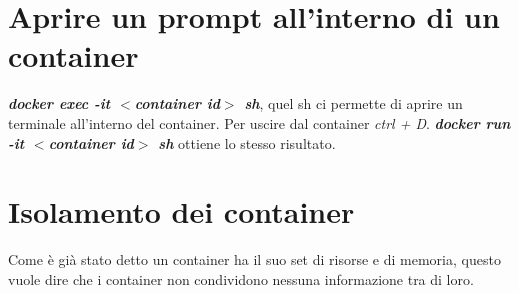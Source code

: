 \documentclass[11pt,a4paper]{book}
\begin{document}
\section{Aprire un prompt all'interno di un container}
\emph{\textbf{docker exec -it $<$container id$>$ sh}}, quel sh ci permette di aprire un terminale all'interno del container. Per uscire dal container \emph{ctrl + D}. \emph{\textbf{docker run -it $<$container id$>$ sh}} ottiene lo stesso risultato.

\section{Isolamento dei container}
Come è già stato detto un container ha il suo set di risorse e di memoria, questo vuole dire che i container non condividono nessuna informazione tra di loro.
\end{document}

